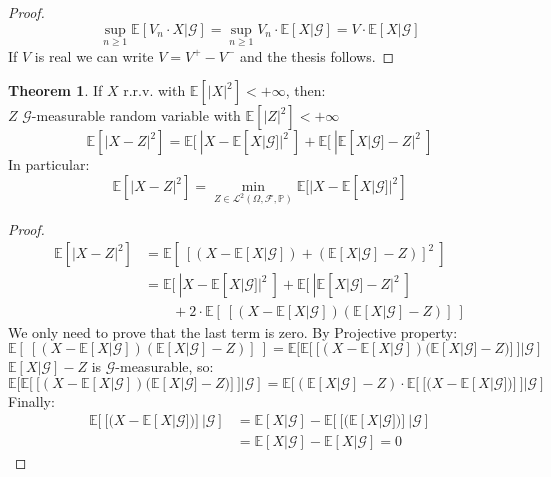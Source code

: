 \documentclass[10pt,a4paper]{article}
\theoremstyle{definition}
\newtheorem{teo}{Theorem}[section]
\begin{document}
\begin{enumerate}
\begin{proof}
\begin{equation*}
	\sup_{n\geq 1}\mathbb{E}[V_n\cdot X|\mathcal{G}]=
	\sup_{n\geq 1}V_n\cdot \mathbb{E}[X|\mathcal{G}] =
	V\cdot \mathbb{E}[X|\mathcal{G}]
\end{equation*} 
If $V$ is real we can write $V=V^{+}-V^{-}$ and the thesis follows.
\end{proof}
\begin{teo}
If $X$ r.r.v. with $\mathbb{E}[|X|^2]<+\infty $, then:\\
$Z$ $\mathcal{G}$-measurable random variable with $\mathbb{E}[|Z|^2]<+\infty$\\
\begin{equation*}
	\mathbb{E}[|X-Z|^2]=\mathbb{E}[\ |X-\mathbb{E}[X|\mathcal{G}]|^2\ ]+\mathbb{E}[\ |\mathbb{E}[X|\mathcal{G}]-Z|^2\ ]
\end{equation*}
In particular:
\begin{equation*}
	\mathbb{E}[|X-Z|^2]=\min_{Z\in\mathcal{L}^2(\Omega,\mathcal{F},\mathbb{P})}\mathbb{E}[|X-\mathbb{E}[X|\mathcal{G}]|^2]
\end{equation*}
\end{teo}
\begin{proof}
	\begin{equation*}
		\begin{split}
			\mathbb{E}[|X-Z|^2]&=\mathbb{E}[\ [(X-\mathbb{E}[X|\mathcal{G}])+(\mathbb{E}[X|\mathcal{G}]-Z)]^2\ ]\\
			&=\mathbb{E}[\ |X-\mathbb{E}[X|\mathcal{G}]|^2\ ]+\mathbb{E}[\ |\mathbb{E}[X|\mathcal{G}]-Z|^2\ ]\\
			&\qquad+2\cdot\mathbb{E}[\ [(X-\mathbb{E}[X|\mathcal{G}])(\mathbb{E}[X|\mathcal{G}]-Z)]\ ]
		\end{split}		
	\end{equation*}
We only need to prove that the last term is zero.
By Projective property:
\begin{equation*}
\mathbb{E}[\ [(X-\mathbb{E}[X|\mathcal{G}])(\mathbb{E}[X|\mathcal{G}]-Z)]\ ]=
\mathbb{E}[\mathbb{E}[\ [(X-\mathbb{E}[X|\mathcal{G}])(\mathbb{E}[X|\mathcal{G}]-Z)]\ ]|\mathcal{G}]
\end{equation*}
$\mathbb{E}[X|\mathcal{G}]-Z$ is $\mathcal{G}$-measurable, so:
\begin{equation*}
	\mathbb{E}[\mathbb{E}[\ [(X-\mathbb{E}[X|\mathcal{G}])(\mathbb{E}[X|\mathcal{G}]-Z)]\ ]|\mathcal{G}]=
	\mathbb{E}[(\mathbb{E}[X|\mathcal{G}]-Z)\cdot\mathbb{E}[\ [(X-\mathbb{E}[X|\mathcal{G}])]\ ]|\mathcal{G}]
\end{equation*}
Finally:
\begin{equation*}
	\begin{split}
		\mathbb{E}[\ [(X-\mathbb{E}[X|\mathcal{G}])]\ |\mathcal{G}]&=\mathbb{E}[X|\mathcal{G}]-\mathbb{E}[\ [(\mathbb{E}[X|\mathcal{G}])]\ |\mathcal{G}]\\
		&=\mathbb{E}[X|\mathcal{G}]-\mathbb{E}[X|\mathcal{G}]=0
	\end{split}
\end{equation*}
\end{proof}
\end{enumerate}
\end{document}
